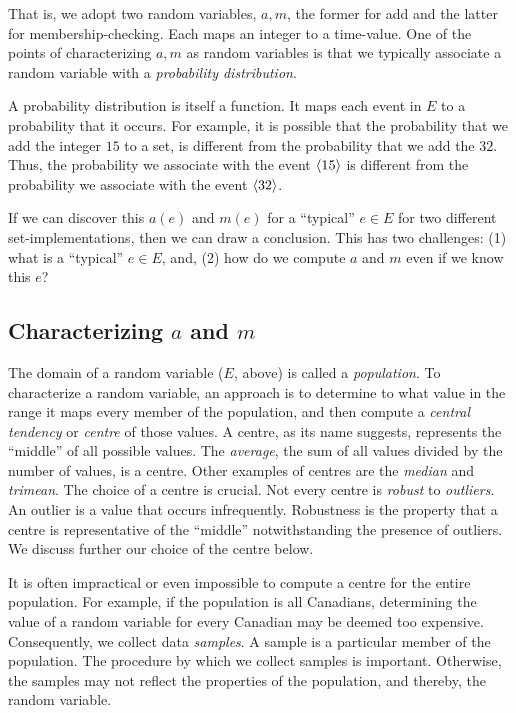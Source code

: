 That is, we adopt two random variables, $a, m$, the former
for add and the latter for membership-checking. Each maps
an integer to a time-value. One of the points of characterizing
$a, m$ as random variables is that
we typically associate
a random variable with a \emph{probability distribution}.

A probability distribution is itself a function. It maps
each event in $E$ to a probability that it occurs.
For example, it is possible that the
probability that we add the integer $15$ to a set,
is different from the probability that we add the $32$.
Thus, the probability we associate with the event
$\left\langle 15 \right\rangle$ is different from the probability
we associate with the event $\left\langle 32 \right\rangle$.

If we can discover this $a(e)$ and $m(e)$
for a ``typical'' $e \in E$ for
two different set-implementations, then we can draw a conclusion.
This has two challenges: (1) what is a ``typical'' $e \in E$, and,
(2) how do we compute $a$ and $m$ even if we know this $e$?

\subsection{Characterizing $a$ and $m$}\label{sec:statictics:charac}
The domain of a random variable ($E$, above) is called a
\emph{population}. To characterize a random variable, an approach
is to determine to what value in the range it maps every member of
the population, and then compute a \emph{central tendency} or
\emph{centre} of those values.
A centre, as its name suggests, represents the ``middle'' of
all possible values. The \emph{average}, the sum of all values
divided by the number of values, is a centre. Other examples of
centres are the \emph{median} and \emph{trimean}.
The choice of a centre is crucial. Not every centre is
\emph{robust} to \emph{outliers}. An outlier is a value
that occurs infrequently. Robustness is the property that
a centre is representative of the ``middle'' notwithstanding
the presence of outliers. We discuss further our choice
of the centre below.

It is often impractical or even impossible to compute a
centre for the entire population. For example, if the population
is all Canadians, determining the value of a random variable
for every Canadian may be deemed too expensive.
Consequently, we collect data \emph{samples}.
A sample is a particular member of the population.
The procedure by which we collect samples is important. Otherwise,
the samples may not reflect the properties of the population,
and thereby, the random variable.

